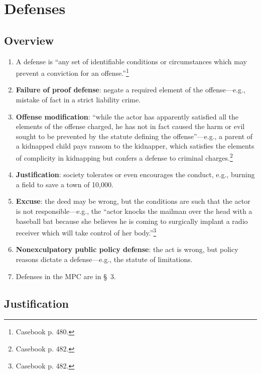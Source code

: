 \section{Defenses}

\subsection{Overview}

\begin{enumerate}
    \item A defense is ``any set of identifiable conditions or circumstances 
    which may prevent a conviction for an offense.''\footnote{Casebook p. 480.}
    \item \textbf{Failure of proof defense}: negate a required element of the 
    offense---e.g., mistake of fact in a strict liability crime.
    \item \textbf{Offense modification}: ``while the actor has apparently 
    satisfied all the elements of the offense charged, he has not in fact 
    caused the harm or evil sought to be prevented by the statute defining the 
    offense''---e.g., a parent of a kidnapped child pays ransom to the 
    kidnapper, which satisfies the elements of complicity in kidnapping but 
    confers a defense to criminal charges.\footnote{Casebook p. 482.}
    \item \textbf{Justification}: society tolerates or even encourages the 
    conduct, e.g., burning a field to save a town of 10,000.
    \item \textbf{Excuse}: the deed may be wrong, but the conditions are such 
    that the actor is not responsible---e.g., the ``actor knocks the mailman 
    over the head with a baseball bat because she believes he is coming to 
    surgically implant a radio receiver which will take control of her 
    body.''\footnote{Casebook p. 482.}
    \item \textbf{Nonexculpatory public policy defense}: the act is wrong, but 
    policy reasons dictate a defense---e.g., the statute of limitations.
    \item Defenses in the MPC are in \S\ 3.
\end{enumerate}

\subsection{Justification}

